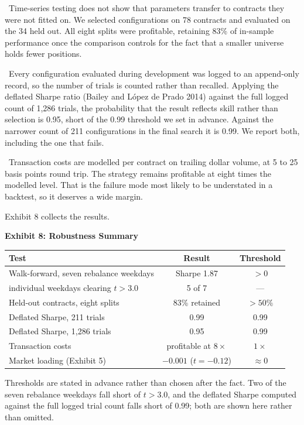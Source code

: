 \documentclass[12pt]{article}
\newcommand{\runin}[1]{\par\vspace{2pt}\noindent\hspace*{0.5in}{\bfseries #1}\ \ignorespaces}
\newenvironment{exhibit}[2]{%
  \par\vspace{14pt}\noindent\begin{minipage}{\textwidth}\centering\small
  \textbf{Exhibit #1: #2}\par\vspace{6pt}}%
  {\end{minipage}\par\vspace{12pt}}
\newcommand{\exnote}[1]{\par\vspace{4pt}%
  \begin{minipage}{0.88\textwidth}\fontsize{9}{11}\selectfont #1\end{minipage}}
\begin{document}
\runin{Generalisation across assets.}Time-series testing does not show that parameters transfer to contracts they were
not fitted on. We selected configurations on 78 contracts and evaluated on the 34
held out. All eight splits were profitable, retaining 83\% of in-sample
performance once the comparison controls for the fact that a smaller universe
holds fewer positions.

\runin{Correcting for the search itself.}Every configuration evaluated during development was logged to an append-only
record, so the number of trials is counted rather than recalled. Applying the
deflated Sharpe ratio (Bailey and L\'opez de Prado 2014) against the full logged
count of 1,286 trials, the probability that the result reflects skill rather than
selection is 0.95, short of the 0.99 threshold we set in advance. Against the
narrower count of 211 configurations in the final search it is 0.99. We report
both, including the one that fails.

\runin{Costs.}Transaction costs are modelled per contract on trailing dollar volume, at 5 to 25
basis points round trip. The strategy remains profitable at eight times the
modelled level. That is the failure mode most likely to be understated in a
backtest, so it deserves a wide margin.

Exhibit 8 collects the results.

\begin{exhibit}{8}{Robustness Summary}
\begin{tabular}{lcc}
\toprule
Test & Result & Threshold \\
\midrule
Walk-forward, seven rebalance weekdays & Sharpe 1.87 & $>0$ \\
\quad individual weekdays clearing $t>3.0$ & 5 of 7 & --- \\
Held-out contracts, eight splits & 83\% retained & $>50\%$ \\
Deflated Sharpe, 211 trials & 0.99 & 0.99 \\
Deflated Sharpe, 1,286 trials & 0.95 & 0.99 \\
Transaction costs & profitable at $8\times$ & $1\times$ \\
Market loading (Exhibit 5) & $-0.001$ ($t=-0.12$) & $\approx 0$ \\
\bottomrule
\end{tabular}
\exnote{Thresholds are stated in advance rather than chosen after the fact. Two
of the seven rebalance weekdays fall short of $t>3.0$, and the deflated Sharpe
computed against the full logged trial count falls short of 0.99; both are shown
here rather than omitted.}
\end{exhibit}
\end{document}
